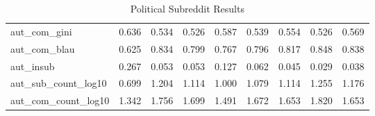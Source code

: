 \begin{table}
\begin{tabular}{lllllllll}
aut\_com\_gini        &      0.636 &       0.534 &        0.526 &    0.587 &        0.539 &     0.554 &               0.526 &               0.569 \\
aut\_com\_blau        &      0.625 &       0.834 &        0.799 &    0.767 &        0.796 &     0.817 &               0.848 &               0.838 \\
aut\_insub           &      0.267 &       0.053 &        0.053 &    0.127 &        0.062 &     0.045 &               0.029 &               0.038 \\
aut\_sub\_count\_log10 &      0.699 &       1.204 &        1.114 &    1.000 &        1.079 &     1.114 &               1.255 &               1.176 \\
aut\_com\_count\_log10 &      1.342 &       1.756 &        1.699 &    1.491 &        1.672 &     1.653 &               1.820 &               1.653 \\
\bottomrule
\end{tabular}
\caption{Political Subreddit Results}
\label{table/pol}
\end{table}